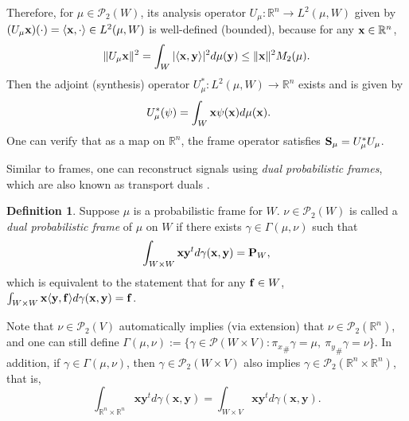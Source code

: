 \documentclass{amsart}
\numberwithin{equation}{section}
\newcommand{\bP}{{\mathbf P}}
\theoremstyle{plain}
\theoremstyle{remark}
\theoremstyle{definition}
\newtheorem{definition}[theorem]{Definition}
\begin{document}
Therefore, for $\mu \in \mathcal{P}_2(W)$, its analysis operator $U_\mu: \mathbb{R}^n \rightarrow L^2(\mu, W)$ given by $(U_\mu{\bf x})(\cdot) = \langle {\bf x}, \cdot \rangle \in L^2(\mu, W)$ is well-defined (bounded), because for any ${\bf x} \in \mathbb{R}^n$, 
\begin{equation*}
    \| U_\mu{\bf x}\|^2 = \int_{W} |\langle{\bf x}, {\bf y}\rangle|^2 d\mu({\bf y}) \leq \|{\bf x}\|^2 M_2(\mu). 
\end{equation*}
Then the adjoint (synthesis) operator $U_\mu^*: L^2(\mu, W) \rightarrow \mathbb{R}^n$ exists and is given by 
\begin{equation*}
    \ U_\mu^*(\psi) = \int_{W} {\bf x}  \psi({\bf x}) d\mu({\bf x}). 
\end{equation*}
One can verify that as a map on $\mathbb{R}^n$, the frame operator satisfies ${\bf S}_\mu =  U_\mu^* U_\mu$.

Similar to frames, one can reconstruct signals using \emph{dual probabilistic frames}, which are also known as transport duals \cite{wickman2014optimal}. 

\begin{definition}\label{dualDefinition}
Suppose $\mu$ is a probabilistic frame for $W$. $\nu \in \mathcal{P}_2(W)$ is called a \emph{dual probabilistic frame} of $\mu$ on $W$ if there exists $\gamma \in \Gamma(\mu, \nu)$ such that 
\begin{equation*}
   \int_{W \times W} {\bf x}{\bf y}^t d\gamma({\bf x}, {\bf y}) = \bP_W, 
\end{equation*}
which is equivalent to the statement that for any ${\bf f} \in W$, $\int_{W \times W} {\bf x} \langle {\bf y}, {\bf f} \rangle d\gamma({\bf x}, {\bf y}) = {\bf f}$. 
\end{definition}

Note that $\nu \in \mathcal{P}_2(V)$ automatically implies (via extension) that $\nu \in \mathcal{P}_2(\mathbb{R}^n)$, and one can still define $ \Gamma(\mu,\nu) :=  \{ \gamma \in \mathcal{P}(W \times V): {\pi_{{ x}}}_{\#} \gamma = \mu, \ {\pi_{{ y}}}_{\#} \gamma = \nu \}$. In addition, if $\gamma \in \Gamma(\mu, \nu)$, then $\gamma \in  \mathcal{P}_2(W \times V)$ also implies $\gamma \in  \mathcal{P}_2(\mathbb{R}^n \times \mathbb{R}^n)$, that is, 
\begin{equation*}
  \int_{\mathbb{R}^n \times \mathbb{R}^n} \mathbf{x} \mathbf{y}^t d\gamma(\mathbf{x}, \mathbf{y}) =  \int_{W \times V} \mathbf{x} \mathbf{y}^t d\gamma(\mathbf{x}, \mathbf{y}).
\end{equation*}
\end{document}
